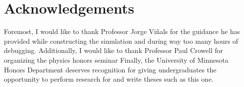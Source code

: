 \documentclass[preprint, aps]{revtex4-1}
\begin{document}
\section*{Acknowledgements}
Foremost, I would like to thank Professor Jorge Vi\~nals for the guidance he has
provided while constructing the simulation and during way too many hours of
debugging. Additionally, I would like to thank Professor Paul Crowell for
organizing the physics honors seminar Finally, the University of Minnesota 
Honors Department deserves recognition for giving undergraduates the opportunity
to perform research for and write theses such as this one.


{}

\end{document}

